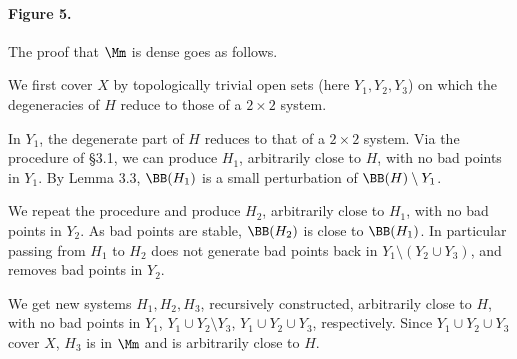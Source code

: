 \paragraph{Figure 5.} The proof that $\Mm$ is dense goes as follows.
\begin{enumeratei}
\item[(a)] We first cover $X$ by topologically trivial open sets (here $Y_1,Y_2,Y_3$) on which the degeneracies of $H$ reduce to those of a $2\times2$ system.
\item[(b)] In $Y_1$, the degenerate part of $H$ reduces to that of a $2\times2$ system. Via the procedure of \S3.1, we can produce $H_1$, arbitrarily close to $H$, with no bad points in $Y_1$. By Lemma 3.3, $\BB(H_1)$ is a small perturbation of $\BB(H)\setminus Y_1$.
\item[(c)] We repeat the procedure and produce $H_2$, arbitrarily close to $H_1$, with no bad points in $Y_2$. As bad points are stable, $\BB(H_2)$ is close to $\BB(H_1)$. In particular passing from $H_1$ to $H_2$ does not generate bad points back in $Y_1\setminus(Y_2\cup Y_3)$, and removes bad points in $Y_2$.
\item[(d)] We get new systems $H_1,H_2,H_3$, recursively constructed, arbitrarily close to $H$, with no bad points in $Y_1$, $Y_1\cup Y_2\setminus Y_3$, $Y_1\cup Y_2\cup Y_3$, respectively. Since $Y_1\cup Y_2\cup Y_3$ cover $X$, $H_3$ is in $\Mm$ and is arbitrarily close to $H$.
\end{enumeratei}
